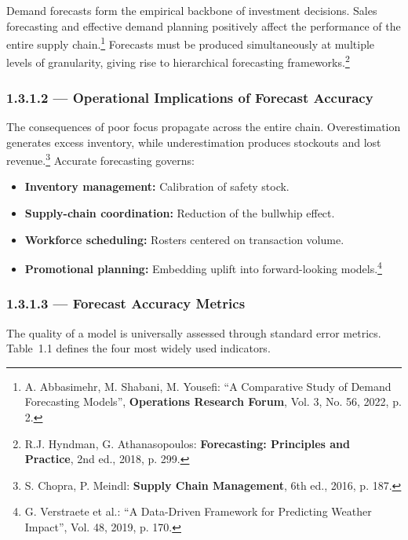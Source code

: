 \documentclass[12pt,a4paper,oneside]{report}
\begin{document}
Demand forecasts form the empirical backbone of investment decisions. Sales forecasting and effective demand planning positively affect the performance of the entire supply chain.\footnote{A. Abbasimehr, M. Shabani, M. Yousefi: ``A Comparative Study of Demand Forecasting Models'', \textbf{Operations Research Forum}, Vol. 3, No. 56, 2022, p. 2.} Forecasts must be produced simultaneously at multiple levels of granularity, giving rise to hierarchical forecasting frameworks.\footnote{R.J. Hyndman, G. Athanasopoulos: \textbf{Forecasting: Principles and Practice}, 2nd ed., 2018, p. 299.}

\subsubsection{1.3.1.2 — Operational Implications of Forecast Accuracy}

The consequences of poor focus propagate across the entire chain. Overestimation generates excess inventory, while underestimation produces stockouts and lost revenue.\footnote{S. Chopra, P. Meindl: \textbf{Supply Chain Management}, 6th ed., 2016, p. 187.} Accurate forecasting governs:
\begin{itemize}
  \item \textbf{Inventory management:} Calibration of safety stock.
  \item \textbf{Supply-chain coordination:} Reduction of the bullwhip effect.
  \item \textbf{Workforce scheduling:} Rosters centered on transaction volume.
  \item \textbf{Promotional planning:} Embedding uplift into forward-looking models.\footnote{G. Verstraete et al.: ``A Data-Driven Framework for Predicting Weather Impact'', Vol. 48, 2019, p. 170.}
\end{itemize}

\subsubsection{1.3.1.3 — Forecast Accuracy Metrics}

The quality of a model is universally assessed through standard error metrics. Table~1.1 defines the four most widely used indicators.
\end{document}
